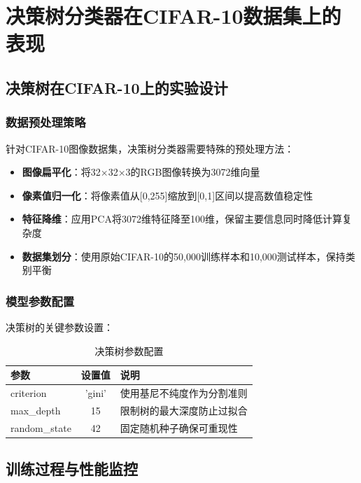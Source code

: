 \documentclass[UTF8]{report}
\theoremstyle{MyLineTheoremStyle} %
\theoremstyle{MyBlockTheoremStyle} %
\theoremstyle{MySubsubsectionStyle} %
\begin{document}
\newpage

\section{决策树分类器在CIFAR-10数据集上的表现}

\subsection{决策树在CIFAR-10上的实验设计}

\subsubsection{数据预处理策略}
针对CIFAR-10图像数据集，决策树分类器需要特殊的预处理方法：

\begin{itemize}
    \item \textbf{图像扁平化}：将32×32×3的RGB图像转换为3072维向量
    \item \textbf{像素值归一化}：将像素值从[0,255]缩放到[0,1]区间以提高数值稳定性
    \item \textbf{特征降维}：应用PCA将3072维特征降至100维，保留主要信息同时降低计算复杂度
    \item \textbf{数据集划分}：使用原始CIFAR-10的50,000训练样本和10,000测试样本，保持类别平衡
\end{itemize}

\subsubsection{模型参数配置}
决策树的关键参数设置：

\begin{table}[h]
\centering
\caption{决策树参数配置}
\begin{tabular}{l c l}
\toprule
\textbf{参数} & \textbf{设置值} & \textbf{说明} \\
\midrule
criterion & 'gini' & 使用基尼不纯度作为分割准则 \\
max\_depth & 15 & 限制树的最大深度防止过拟合 \\
random\_state & 42 & 固定随机种子确保可重现性 \\
\bottomrule
\end{tabular}
\end{table}

\subsection{训练过程与性能监控}
\end{document}

